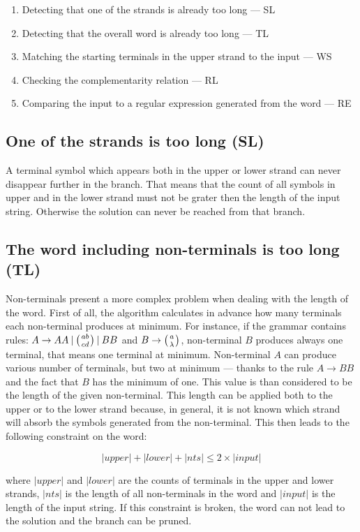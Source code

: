 \begin{enumerate}
  \item{Detecting that one of the strands is already too long --- SL}
  \item{Detecting that the overall word is already too long --- TL}
  \item{Matching the starting terminals in the upper strand to the input --- WS}
  \item{Checking the complementarity relation --- RL}
  \item{Comparing the input to a regular expression generated from the word --- RE}
\end{enumerate}


\subsection{One of the strands is too long (SL)}
A terminal symbol which appears both in the upper or lower strand can never disappear further in the branch. That means that the count of all symbols in upper and in the lower strand must not be grater then the length of the input string. Otherwise the solution can never be reached from that branch.

\subsection{The word including non-terminals is too long (TL)}
Non-terminals present a more complex problem when dealing with the length of the word. First of all, the algorithm calculates in advance how many terminals each non-terminal produces at minimum. For instance, if the grammar contains rules: $A \rightarrow A A \:|\: \wkpair{ab}{cd} \:|\: B B$ and $B \rightarrow \wkpair{a}{\lambda}$, non-terminal $B$ produces always one terminal, that means one terminal at minimum. Non-terminal $A$ can produce various number of terminals, but two at minimum --- thanks to the rule $A \rightarrow B B$ and the fact that $B$ has the minimum of one. This value is than considered to be the length of the given non-terminal.
This length can be applied both to the upper or to the lower strand because, in general, it is not known which strand will absorb the symbols generated from the non-terminal.
This then leads to the following constraint on the word:

$$|upper| + |lower| + |nts| \leq 2 \times |input|$$

where $|upper|$ and $|lower|$ are the counts of terminals in the upper and lower strands, $|nts|$ is the length of all non-terminals in the word and $|input|$ is the length of the input string. If this constraint is broken, the word can not lead to the solution and the branch can be pruned.


